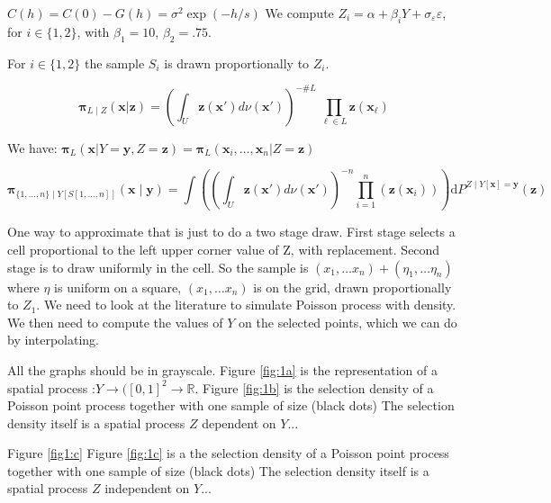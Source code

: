 \documentclass[12pt]{article}
\theoremstyle{definition}
\theoremstyle{remark}
\newcommand{\dominantU}{\nu}
\newcommand{\sampledensity}{\mathbf{\pi}}
\newcommand{\Covariogram}{C}
\newcommand{\derive}{\mathrm{d}}
\newcommand{\Semivariogram}{G}
\newcommand{\Sample}{S}
\newcommand{\position}{\mathbf{x}}
\newcommand{\Sampleindex}{L}
\newcommand{\Signal}{Y}
\newcommand{\signal}{\mathbf{y}}
\newcommand{\Desvar}{Z}
\newcommand{\desvar}{\mathbf{z}}
\begin{document}
$\Covariogram(h)=\Covariogram(0)-\Semivariogram(h)=\sigma^2\exp(-h/s)$
We compute $\Desvar_i=\alpha+\beta_i\Signal+\sigma_\varepsilon \varepsilon$, for $i\in\{1,2\}$, with $\beta_1=10$, $\beta_2=.75$.

For $i\in\{1,2\}$ the  sample $\Sample_i$ is drawn proportionally to $\Desvar_i$.




\begin{equation}\label{eq:oiujoij}
   \sampledensity_{\Sampleindex\mid \Desvar}\left(\position|\desvar\right)=\left(\int_{U}{\desvar\left(\position'\right)d\dominantU\left(\position'\right)}\right)^{-\#\Sampleindex}~\prod_{\ell\in \Sampleindex}{\desvar\left(\position_{\ell}\right)}
\end{equation}


We have:
$ \sampledensity_\Sampleindex\left(\position|\Signal=\signal,\Desvar=\desvar\right)= \sampledensity_\Sampleindex\left(\position_{i},\dots,\position_{n}|\Desvar=\desvar\right)$


\begin{equation}
    \sampledensity_{\{1,\ldots,n\}\mid\Signal[\Sample[1,\ldots,n]]}\left(\position\mid
    \signal\right)=\int\left({\left(\int_{U}{\desvar\left(\position'\right)d\dominantU\left(\position'\right)}\right)^{-n}}\prod_{i=1}^{n}\left({\desvar\left(\position_{i}\right)}\right)\right)  \derive P^{\Desvar\mid\Signal[\position]=
    \signal}(\desvar)
\end{equation}


One way to approximate that is just to do a two stage draw. First stage selects a cell proportional to the left upper corner value of Z, with replacement. Second stage is to draw uniformly in the cell.
So the sample is 
$(x_1,\ldots x_n)+(\eta_1,\ldots\eta_n)$ where $\eta$ is uniform on a square, $(x_1,\ldots x_n)$ is on the grid, drawn proportionally to $Z_1$.
We need to look at the literature to simulate Poisson process with density.
We then need to compute the values of $\Signal$ on the selected points, which we can do by interpolating.

{\color{red}All the graphs should be in grayscale.}
Figure \ref{fig:1a} is the representation of a spatial process :$\Signal\to([0,1]^2\to\mathbb{R}$.
Figure \ref{fig:1b} is the selection density of a Poisson point process together with one sample of size (black dots) The selection density itself is a spatial process $\Desvar$ dependent on $\Signal$...

Figure \ref{fig1:c} Figure \ref{fig:1c} is a  the selection density of a Poisson point process together with one sample of size (black dots) The selection density itself is a spatial process $\Desvar$ independent on $\Signal$...
\end{document}
